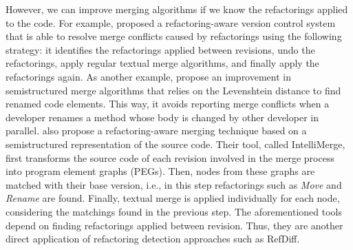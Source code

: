 However, we can improve merging algorithms if we know the refactorings applied to the code.
For example, \cite{dig2008effective} proposed a refactoring-aware version control system that is able to resolve merge conflicts caused by refactorings using the following strategy: it identifies the refactorings applied between revisions, undo the refactorings, apply regular textual merge algorithms, and finally apply the refactorings again.
As another example, \cite{cavalcanti2017evaluating} propose an improvement in semistructured merge algorithms that relies on the Levenshtein distance to find renamed code elements. This way, it avoids reporting merge conflicts when a developer renames a method whose body is changed by other developer in parallel.
\cite{shen2019intellimerge} also propose a refactoring-aware merging technique based on a semistructured representation of the source code.
Their tool, called IntelliMerge, first transforms the source code of each revision involved in the merge process into program element graphs (PEGs).
Then, nodes from these graphs are matched with their base version, i.e., in this step refactorings such as \emph{Move} and \emph{Rename} are found.
Finally, textual merge is applied individually for each node, considering the matchings found in the previous step.
The aforementioned tools depend on finding refactorings applied between revision. Thus, they are another direct application of refactoring detection approaches such as RefDiff.


